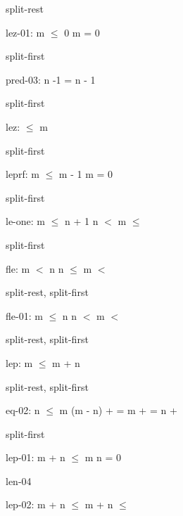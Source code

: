 \documentclass[a4paper]{article}
\begin{document}
split-rest

\bigskip

lez-01: 
 \Fol m $\le$ 0 \Equiv m = 0



split-first

\bigskip

pred-03: 
 \Fol n -1 = n - 1



split-first

\bigskip

lez: 
  $\le$ m



split-first

\bigskip

leprf: 
 \Fol m $\le$ m - 1 \Imp m = 0



split-first

\bigskip

le-one: 
 \Fol m $\le$ n + 1 \And n $<$  \Imp m $\le$ 



split-first

\bigskip

fle: 
 \Fol m $<$ n \And n $\le$  \Imp m $<$ 



split-rest, split-first

\bigskip

fle-01: 
 \Fol m $\le$ n \And n $<$  \Imp m $<$ 



split-rest, split-first

\bigskip

lep: 
 \Fol m $\le$ m + n



split-rest, split-first

\bigskip

eq-02: 
n $\le$ m
 \Fol (m - n) +  =  \Equiv m +  = n + 



split-first

\bigskip

lep-01: 
 \Fol m + n $\le$ m \Equiv n = 0



len-04

\bigskip

lep-02: 
 \Fol m + n $\le$ m +  \Equiv n $\le$ 
\end{document}
